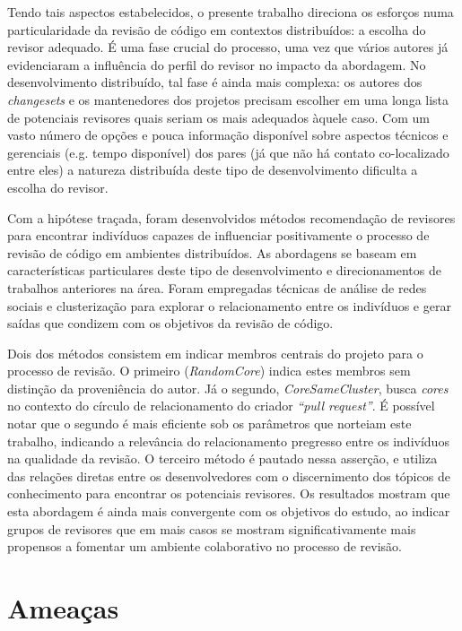 \documentclass[12pt,openany,oneside,a4paper,english,brazil]{abntbibufjf}
\begin{document}
Tendo tais aspectos estabelecidos, o presente trabalho direciona os esforços numa particularidade da revisão de código em contextos distribuídos: a escolha do revisor adequado. É uma fase crucial do processo, uma vez que vários autores já evidenciaram a influência do perfil do revisor no impacto da abordagem. No desenvolvimento distribuído, tal fase é ainda mais complexa: os autores dos \textit{changesets} e os mantenedores dos projetos precisam escolher em uma longa lista de potenciais revisores quais seriam os mais adequados àquele caso. Com um vasto número de opções e pouca informação disponível sobre aspectos técnicos e gerenciais (e.g. tempo disponível) dos pares (já que não há contato co-localizado entre eles) a natureza distribuída deste tipo de desenvolvimento dificulta a escolha do revisor.

Com a hipótese traçada, foram desenvolvidos métodos recomendação de revisores para encontrar indivíduos capazes de influenciar positivamente o processo de revisão de código em ambientes distribuídos. As abordagens se baseam em características particulares deste tipo de desenvolvimento e direcionamentos de trabalhos anteriores na área. Foram empregadas técnicas de análise de redes sociais e clusterização para explorar o relacionamento entre os indivíduos e gerar saídas que condizem com os objetivos da revisão de código.

Dois dos métodos consistem em indicar membros centrais do projeto para o processo de revisão. O primeiro (\textit{RandomCore}) indica estes membros sem distinção da proveniência do autor. Já o segundo, \textit{CoreSameCluster}, busca \textit{cores} no contexto do círculo de relacionamento do criador \textit{``pull request''}. É possível notar que o segundo é mais eficiente sob os parâmetros que norteiam este trabalho, indicando a relevância do relacionamento pregresso entre os indivíduos na qualidade da revisão. O terceiro método é pautado nessa asserção, e utiliza das relações diretas entre os desenvolvedores com o discernimento dos tópicos de conhecimento para encontrar os potenciais revisores. Os resultados mostram que esta abordagem é ainda mais convergente com os objetivos do estudo, ao indicar grupos de revisores que em mais casos se mostram significativamente mais propensos a fomentar um ambiente colaborativo no processo de revisão.

  \section{Ameaças}\label{sec:ameacas}
\end{document}
